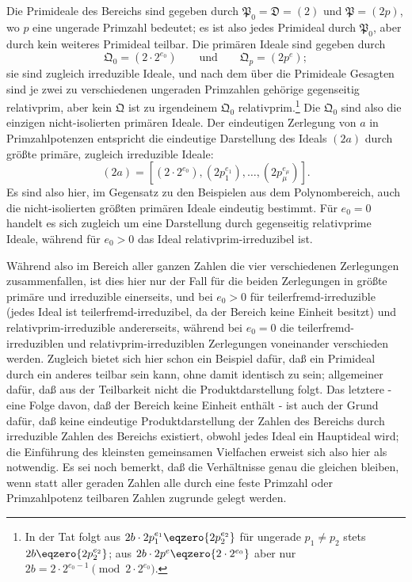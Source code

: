 \documentclass[11pt]{article}
\newcommand{\ideal}[1]{\mathfrak{#1}}
\begin{document}
Die Primideale des Bereichs sind gegeben durch $\ideal P_0=\ideal D=(2)$ und $\ideal P=(2p)$, wo $p$ eine ungerade Primzahl bedeutet; es ist also jedes Primideal durch $\ideal P_0$, aber durch kein weiteres Primideal teilbar. Die primären Ideale sind gegeben durch
\[
 \ideal Q_0=(2\cdot2^{e_0})
 \qquad\text{und}\qquad
 \ideal Q_p=(2p^e);
\]
sie sind zugleich irreduzible Ideale, und nach dem über die Primideale Gesagten sind je zwei zu verschiedenen ungeraden Primzahlen gehörige gegenseitig relativprim, aber kein $\ideal Q$ ist zu irgendeinem $\ideal Q_0$ relativprim.\footnote{In der Tat folgt aus $2b\cdot2p_1^{e_1}\eqzero{2p_2^{e_2}}$ für ungerade $p_1\ne p_2$ stets $2b\eqzero{2p_2^{e_2}}$; aus $2b\cdot2p^e\eqzero{2\cdot2^{e_0}}$ aber nur $2b=2\cdot2^{e_0-1}\pmod{2\cdot2^{e_0}}$.} Die $\ideal Q_0$ sind also die einzigen nicht-isolierten primären Ideale. Der eindeutigen Zerlegung von $a$ in Primzahlpotenzen entspricht die eindeutige Darstellung des Ideals $(2a)$ durch größte primäre, zugleich irreduzible Ideale:
\[
 (2a)=[(2\cdot2^{e_0}),(2p_1^{e_1}),
\ldots,(2p_\mu^{e_\mu})].
\]
Es sind also hier, im Gegensatz zu den Beispielen aus dem Polynombereich, auch die nicht-isolierten größten primären Ideale eindeutig bestimmt. Für $e_0=0$ handelt es sich zugleich um eine Darstellung durch gegenseitig relativprime Ideale, während für $e_0>0$ das Ideal relativprim-irreduzibel ist.

Während also im Bereich aller ganzen Zahlen die vier verschiedenen Zerlegungen zusammenfallen, ist dies hier nur der Fall für die beiden Zerlegungen in größte primäre und irreduzible einerseits, und bei $e_0>0$ für teilerfremd-irreduzible (jedes Ideal ist teilerfremd-irreduzibel, da der Bereich keine Einheit besitzt) und relativprim-irreduzible andererseits, während bei $e_0=0$ die teilerfremd-irreduziblen und relativprim-irreduziblen Zerlegungen voneinander verschieden werden. Zugleich bietet sich hier schon ein Beispiel dafür, daß ein Primideal durch ein anderes teilbar sein kann, ohne damit identisch zu sein; allgemeiner dafür, daß aus der Teilbarkeit nicht die Produktdarstellung folgt. Das letztere - eine Folge davon, daß der Bereich keine Einheit enthält - ist auch der Grund dafür, daß keine eindeutige Produktdarstellung der Zahlen des Bereichs durch irreduzible Zahlen des Bereichs existiert, obwohl jedes Ideal ein Hauptideal wird; die Einführung des kleinsten gemeinsamen Vielfachen erweist sich also hier als notwendig. Es sei noch bemerkt, daß die Verhältnisse genau die gleichen bleiben, wenn statt aller geraden Zahlen alle durch eine feste Primzahl oder Primzahlpotenz teilbaren Zahlen zugrunde gelegt werden.
\end{document}
